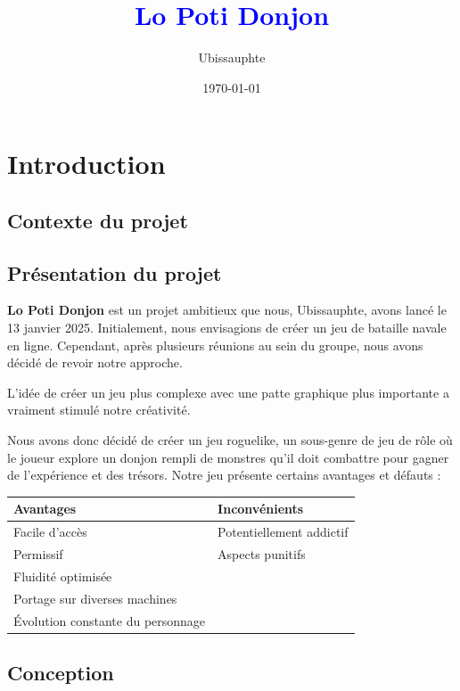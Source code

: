 \documentclass[a4paper,11pt]{article}
\begin{document}
\title{\huge{\textbf{\textcolor{blue}{Lo Poti Donjon}}}}
\author{\Large{Ubissauphte}}
\date{\today}
\maketitle
\newpage
\tableofcontents
\newpage

\section{Introduction}
\subsection{Contexte du projet}
\subsection{Présentation du projet}

\textbf{Lo Poti Donjon} est un projet ambitieux que nous, Ubissauphte, avons lancé le 13 janvier 2025. Initialement, nous envisagions de créer 
un jeu de bataille navale en ligne. Cependant, après plusieurs réunions au sein du groupe, nous avons décidé de revoir notre approche. 

L'idée de créer un jeu plus complexe avec une patte graphique plus importante a vraiment stimulé notre créativité.

Nous avons donc décidé de créer un jeu roguelike, un sous-genre de jeu de rôle où le joueur explore 
un donjon rempli de monstres qu'il doit combattre pour gagner de l'expérience et des trésors. Notre jeu présente certains avantages et défauts :

\begin{center}
\begin{tabular}{p{5cm}|p{5cm}}
\toprule
\textbf{Avantages} & \textbf{Inconvénients} \\
\midrule
Facile d'accès & Potentiellement addictif \\
Permissif & Aspects punitifs \\
Fluidité optimisée & \\
Portage sur diverses machines & \\
Évolution constante du personnage & \\
\bottomrule
\end{tabular}
\end{center}

\subsection{Conception}
\newpage
\end{document}
